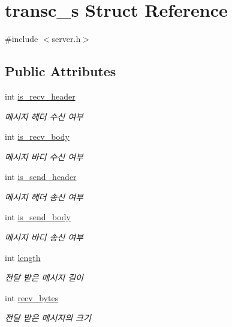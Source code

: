 \hypertarget{structtransc__s}{\section{transc\-\_\-s Struct Reference}
\label{structtransc__s}
}


{\ttfamily \#include $<$server.\-h$>$}

\subsection*{Public Attributes}
\begin{DoxyCompactItemize}
\item 
int \hyperlink{structtransc__s_a684a0026e8ca2dd3519fcbc8d9c21135}{is\-\_\-recv\-\_\-header}
\begin{DoxyCompactList}\small\item\em 메시지 헤더 수신 여부 \end{DoxyCompactList}\item 
int \hyperlink{structtransc__s_a933576e2cfbc542bc7eb4adef73891a9}{is\-\_\-recv\-\_\-body}
\begin{DoxyCompactList}\small\item\em 메시지 바디 수신 여부 \end{DoxyCompactList}\item 
int \hyperlink{structtransc__s_a7178f7c31cbe28f06470575d955e09d1}{is\-\_\-send\-\_\-header}
\begin{DoxyCompactList}\small\item\em 메시지 헤더 송신 여부 \end{DoxyCompactList}\item 
int \hyperlink{structtransc__s_a5dc3cf081807fe042565a3bcadc1a653}{is\-\_\-send\-\_\-body}
\begin{DoxyCompactList}\small\item\em 메시지 바디 송신 여부 \end{DoxyCompactList}\item 
int \hyperlink{structtransc__s_a636aafe11d1ad736f2f640608b977686}{length}
\begin{DoxyCompactList}\small\item\em 전달 받은 메시지 길이 \end{DoxyCompactList}\item 
int \hyperlink{structtransc__s_aef73ff34bbe9058828cde7c551549fb0}{recv\-\_\-bytes}
\begin{DoxyCompactList}\small\item\em 전달 받은 메시지의 크기 \end{DoxyCompactList}\item 

\end{DoxyCompactItemize}
